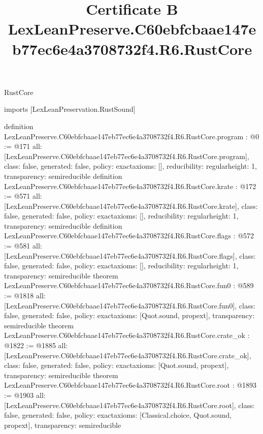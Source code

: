 \begin{lexlean}{RustCore}
\title{Certificate B LexLeanPreserve.C60ebfcbaae147eb77ec6e4a3708732f4.R6.RustCore}
\begin{coremodule}
imports [LexLeanPreservation.RustSound]

definition LexLeanPreserve.C60ebfcbaae147eb77ec6e4a3708732f4.R6.RustCore.program : @0 := @171 {
  all: [LexLeanPreserve.C60ebfcbaae147eb77ec6e4a3708732f4.R6.RustCore.program],
  class: false,
  generated: false,
  policy: exact{axioms: []},
  reducibility: regular{height: 1},
  transparency: semireducible
}
definition LexLeanPreserve.C60ebfcbaae147eb77ec6e4a3708732f4.R6.RustCore.krate : @172 := @571 {
  all: [LexLeanPreserve.C60ebfcbaae147eb77ec6e4a3708732f4.R6.RustCore.krate],
  class: false,
  generated: false,
  policy: exact{axioms: []},
  reducibility: regular{height: 1},
  transparency: semireducible
}
definition LexLeanPreserve.C60ebfcbaae147eb77ec6e4a3708732f4.R6.RustCore.flags : @572 := @581 {
  all: [LexLeanPreserve.C60ebfcbaae147eb77ec6e4a3708732f4.R6.RustCore.flags],
  class: false,
  generated: false,
  policy: exact{axioms: []},
  reducibility: regular{height: 1},
  transparency: semireducible
}
theorem LexLeanPreserve.C60ebfcbaae147eb77ec6e4a3708732f4.R6.RustCore.fun0 : @589 := @1818 {
  all: [LexLeanPreserve.C60ebfcbaae147eb77ec6e4a3708732f4.R6.RustCore.fun0],
  class: false,
  generated: false,
  policy: exact{axioms: [Quot.sound, propext]},
  transparency: semireducible
}
theorem LexLeanPreserve.C60ebfcbaae147eb77ec6e4a3708732f4.R6.RustCore.crate_ok : @1822 := @1885 {
  all: [LexLeanPreserve.C60ebfcbaae147eb77ec6e4a3708732f4.R6.RustCore.crate_ok],
  class: false,
  generated: false,
  policy: exact{axioms: [Quot.sound, propext]},
  transparency: semireducible
}
theorem LexLeanPreserve.C60ebfcbaae147eb77ec6e4a3708732f4.R6.RustCore.root : @1893 := @1903 {
  all: [LexLeanPreserve.C60ebfcbaae147eb77ec6e4a3708732f4.R6.RustCore.root],
  class: false,
  generated: false,
  policy: exact{axioms: [Classical.choice, Quot.sound, propext]},
  transparency: semireducible
}


\end{coremodule}
\end{lexlean}
